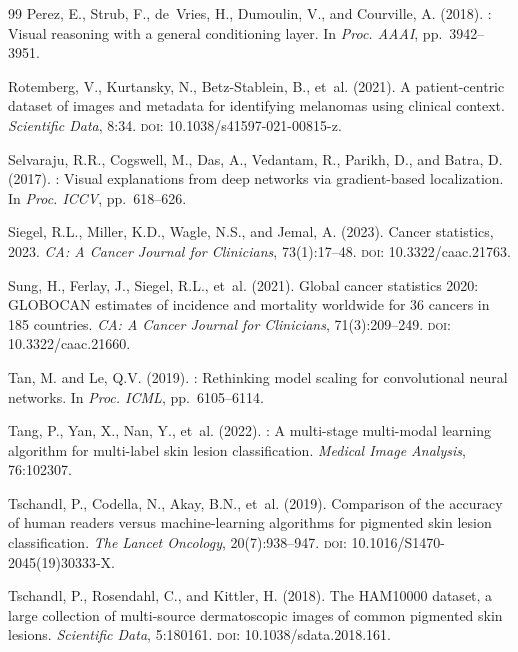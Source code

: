 \documentclass[12pt, a4paper]{article}
\begin{document}
\begin{thebibliography}{99}
Perez, E., Strub, F., de~Vries, H., Dumoulin, V., and Courville, A. (2018).
: Visual reasoning with a general conditioning layer.
\newblock In \emph{Proc. AAAI}, pp.\ 3942--3951.

Rotemberg, V., Kurtansky, N., Betz-Stablein, B., et~al. (2021).
\newblock A patient-centric dataset of images and metadata for identifying melanomas using clinical context.
\newblock \emph{Scientific Data}, 8:34.
\newblock \textsc{doi}: 10.1038/s41597-021-00815-z.

Selvaraju, R.R., Cogswell, M., Das, A., Vedantam, R., Parikh, D., and Batra, D. (2017).
: Visual explanations from deep networks via gradient-based localization.
\newblock In \emph{Proc. ICCV}, pp.\ 618--626.

Siegel, R.L., Miller, K.D., Wagle, N.S., and Jemal, A. (2023).
\newblock Cancer statistics, 2023.
\newblock \emph{CA: A Cancer Journal for Clinicians}, 73(1):17--48.
\newblock \textsc{doi}: 10.3322/caac.21763.

Sung, H., Ferlay, J., Siegel, R.L., et~al. (2021).
\newblock Global cancer statistics 2020: {GLOBOCAN} estimates of incidence and mortality worldwide for 36 cancers in 185 countries.
\newblock \emph{CA: A Cancer Journal for Clinicians}, 71(3):209--249.
\newblock \textsc{doi}: 10.3322/caac.21660.

Tan, M. and Le, Q.V. (2019).
: Rethinking model scaling for convolutional neural networks.
\newblock In \emph{Proc. ICML}, pp.\ 6105--6114.

Tang, P., Yan, X., Nan, Y., et~al. (2022).
: A multi-stage multi-modal learning algorithm for multi-label skin lesion classification.
\newblock \emph{Medical Image Analysis}, 76:102307.

Tschandl, P., Codella, N., Akay, B.N., et~al. (2019).
\newblock Comparison of the accuracy of human readers versus machine-learning algorithms for pigmented skin lesion classification.
\newblock \emph{The Lancet Oncology}, 20(7):938--947.
\newblock \textsc{doi}: 10.1016/S1470-2045(19)30333-X.

Tschandl, P., Rosendahl, C., and Kittler, H. (2018).
\newblock The {HAM10000} dataset, a large collection of multi-source dermatoscopic images of common pigmented skin lesions.
\newblock \emph{Scientific Data}, 5:180161.
\newblock \textsc{doi}: 10.1038/sdata.2018.161.


\end{thebibliography}
\end{document}
